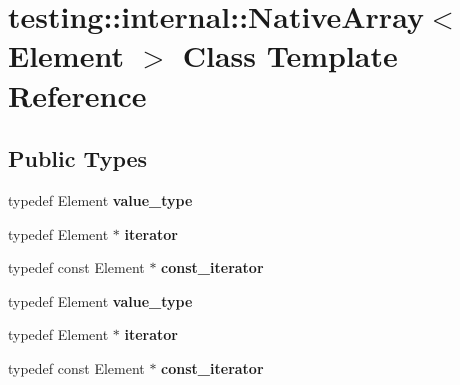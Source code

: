 \hypertarget{classtesting_1_1internal_1_1_native_array}{}\section{testing\+:\+:internal\+:\+:Native\+Array$<$ Element $>$ Class Template Reference}
\label{classtesting_1_1internal_1_1_native_array}
\subsection*{Public Types}
\begin{DoxyCompactItemize}
\item 
\hypertarget{classtesting_1_1internal_1_1_native_array_a12216d686e16e4cc63d952fada5b2ba9}{}typedef Element {\bfseries value\+\_\+type}\label{classtesting_1_1internal_1_1_native_array_a12216d686e16e4cc63d952fada5b2ba9}

\item 
\hypertarget{classtesting_1_1internal_1_1_native_array_ac1301a57977b57a1ad013e4e25fc2a72}{}typedef Element $\ast$ {\bfseries iterator}\label{classtesting_1_1internal_1_1_native_array_ac1301a57977b57a1ad013e4e25fc2a72}

\item 
\hypertarget{classtesting_1_1internal_1_1_native_array_a9ce7c8408460d7158a2870456d134557}{}typedef const Element $\ast$ {\bfseries const\+\_\+iterator}\label{classtesting_1_1internal_1_1_native_array_a9ce7c8408460d7158a2870456d134557}

\item 
\hypertarget{classtesting_1_1internal_1_1_native_array_a12216d686e16e4cc63d952fada5b2ba9}{}typedef Element {\bfseries value\+\_\+type}\label{classtesting_1_1internal_1_1_native_array_a12216d686e16e4cc63d952fada5b2ba9}

\item 
\hypertarget{classtesting_1_1internal_1_1_native_array_ac1301a57977b57a1ad013e4e25fc2a72}{}typedef Element $\ast$ {\bfseries iterator}\label{classtesting_1_1internal_1_1_native_array_ac1301a57977b57a1ad013e4e25fc2a72}

\item 
\hypertarget{classtesting_1_1internal_1_1_native_array_a9ce7c8408460d7158a2870456d134557}{}typedef const Element $\ast$ {\bfseries const\+\_\+iterator}\label{classtesting_1_1internal_1_1_native_array_a9ce7c8408460d7158a2870456d134557}

\end{DoxyCompactItemize}

